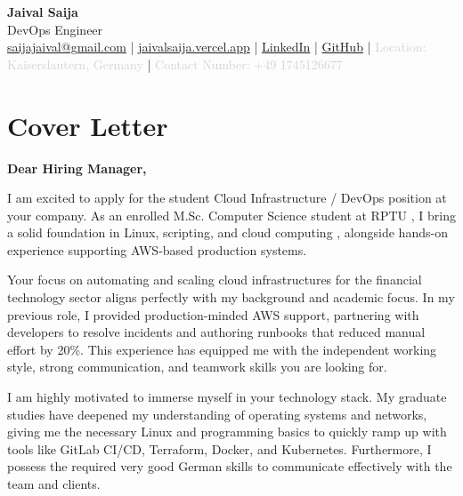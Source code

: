 \documentclass[11pt,a4paper]{article}
\begin{document}
\frenchspacing
{}
\setlength{\emergencystretch}{6em}
\sloppy

\begin{center}
\begin{minipage}{0.92\textwidth}
\centering
    {\Huge\bfseries Jaival Saija}\\[0.5pt]
    {\large DevOps Engineer}\\[2pt]
    {\small
    \href{mailto:saijajaival@gmail.com}{saijajaival@gmail.com} \quad | \quad
    \href{https://jaivalsaija.vercel.app}{jaivalsaija.vercel.app} \quad | \quad
    \href{https://linkedin.com/in/jaivalsaija}{LinkedIn} \quad | \quad
    \href{https://github.com/Jaival}{GitHub} \quad | \quad
    \textcolor{lightgray}{Location: Kaiserslautern, Germany} \quad | \quad
    \textcolor{lightgray}{Contact Number: +49 1745126677}
    }
\end{minipage}
\end{center}

\vspace{4pt}

\section*{Cover Letter}

\textbf{Dear Hiring Manager,}

I am excited to apply for the student Cloud Infrastructure / DevOps position at your company. As an enrolled M.Sc. Computer Science student at RPTU , I bring a solid foundation in Linux, scripting, and cloud computing , alongside hands-on experience supporting AWS-based production systems.

Your focus on automating and scaling cloud infrastructures for the financial technology sector aligns perfectly with my background and academic focus. In my previous role, I provided production-minded AWS support, partnering with developers to resolve incidents and authoring runbooks that reduced manual effort by 20\%. This experience has equipped me with the independent working style, strong communication, and teamwork skills you are looking for.

I am highly motivated to immerse myself in your technology stack. My graduate studies have deepened my understanding of operating systems and networks, giving me the necessary Linux and programming basics to quickly ramp up with tools like GitLab CI/CD, Terraform, Docker, and Kubernetes. Furthermore, I possess the required very good German skills to communicate effectively with the team and clients.
\end{document}
